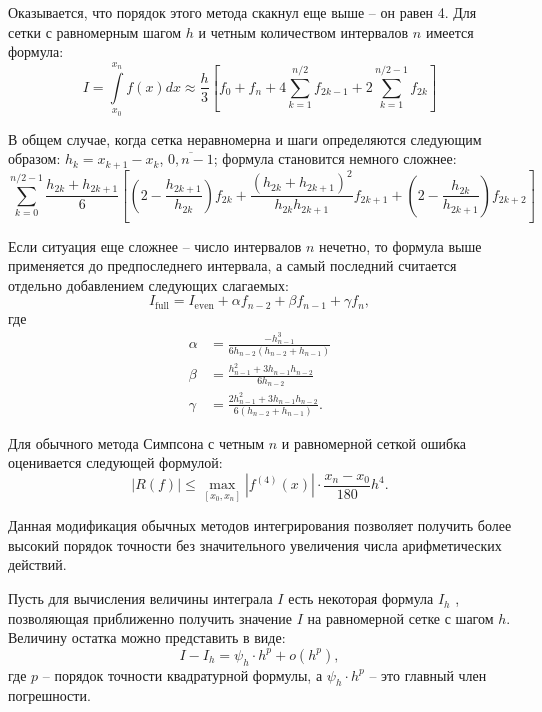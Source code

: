 		Оказывается, что порядок этого метода скакнул еще выше -- он равен 4. Для сетки с равномерным шагом $h$ и четным количеством интервалов $n$ имеется формула:
		\begin{equation}
			I = \int\limits_{x_0}^{x_n} f(x) dx \approx \frac{h}{3} \left[f_0 + f_n + 4\sum\limits_{k = 1}^{n/2}f_{2k-1} + 2\sum\limits_{k=1}^{n/2 - 1}f_{2k}\right]
		\end{equation}
	
		В общем случае, когда сетка неравномерна и шаги определяются следующим образом: $h_k = x_{k+1} - x_k$, $\overline{0, n-1}$; формула становится немного сложнее:
		\begin{equation}
			 \sum\limits_{k = 0}^{n/2 - 1}\frac{h_{2k} + h_{2k+1}}{6}\left[\left(2 - \frac{h_{2k+1}}{h_{2k}}\right)f_{2k} + \frac{(h_{2k} + h_{2k+1})^2}{h_{2k}h_{2k+1}}f_{2k+1} + \left(2 - \frac{h_{2k}}{h_{2k+1}}\right)f_{2k+2}\right]
		\end{equation}
	
		Если ситуация еще сложнее -- число интервалов $n$ нечетно, то формула выше применяется до предпоследнего интервала, а самый последний считается отдельно добавлением следующих слагаемых:
		\begin{equation*}
			I_\text{full} = I_\text{even} + \alpha f_{n-2} + \beta f_{n-1} + \gamma f_n,
		\end{equation*}
		\noindent где
		\begin{align*}
			\alpha &=  \frac{-h_{n-1}^3}{6h_{n-2} (h_{n-2} + h_{n-1})} \\
			\beta  &=  \frac{h_{n-1}^2 + 3h_{n-1}h_{n-2}}{6h_{n-2}} \\
			\gamma &=  \frac{2h_{n-1}^2 + 3h_{n-1}h_{n-2}}{6(h_{n-2} + h_{n-1})}.
		\end{align*}
	
		Для обычного метода Симпсона с четным $n$ и равномерной сеткой ошибка оценивается следующей формулой:
		\begin{equation}
			|R(f)| \leqslant \max\limits_{[x_0, x_n]}|f^{(4)}(x)| \cdot \frac{x_n - x_0}{180}h^4.
		\end{equation}
	
		Данная модификация обычных методов интегрирования позволяет получить более высокий порядок точности без значительного увеличения числа арифметических действий.
		
		Пусть для вычисления величины интеграла $I$ есть некоторая формула $I_h$ , позволяющая приближенно получить значение $I$ на равномерной сетке с шагом $h$. Величину остатка можно представить в виде:
		\begin{equation*}
			I - I_h = \psi_h \cdot h^p + o(h^{p}),
		\end{equation*}
		\noindent где $p$ -- порядок точности квадратурной формулы, а $\psi_h \cdot h^p$ -- это главный член погрешности.
		
